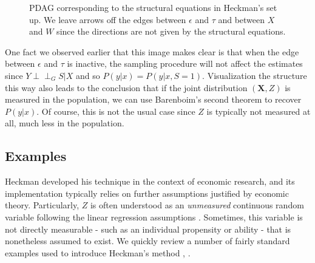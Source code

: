 \documentclass[12pt,twoside]{reedthesis}
\theoremstyle{definition}
\newcommand{\dsep}{\perp \!\!\!\perp}
\begin{document}
\begin{figure}[H]
\begin{center}
\end{center}
\caption{PDAG corresponding to the structural equations in Heckman's set up. We leave arrows off the edges between $\epsilon$ and $\tau$ and between $X$ and $W$ since the directions are not given by the structural equations.}
\end{figure}

One fact we observed earlier that this image makes clear is that when the edge between $\epsilon$ and $\tau$ is inactive, the sampling procedure will not affect the estimates since $Y \dsep_G S | X$ and so $P(y| x) = P(y|x, S = 1)$. Visualization the structure this way also leads to the conclusion that if the joint distribution $(\mathbf{X},Z)$ is measured in the population, we can use Barenboim's second theorem to recover $P(y|x)$. Of course, this is not the usual case since $Z$ is typically not measured at all, much less in the population.



\subsection{Examples}

Heckman developed his technique in the context of economic research, and its implementation typically relies on further assumptions justified by economic theory. Particularly, $Z$ is often understood as an \emph{unmeasured} continuous random variable following the linear regression assumptions \citep{Winship_Mare_1992}. Sometimes,  this variable is not directly measurable - such as an individual propensity or ability - that is nonetheless assumed to exist. We quickly review a number of  fairly standard  examples used to introduce Heckman's method \citep{Heckman_1979}, \citep{Guo_2015}.
\end{document}
